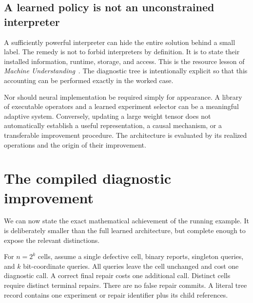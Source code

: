 \documentclass[11pt,letterpaper]{article}
\theoremstyle{plain}
\theoremstyle{definition}
\begin{document}
\subsection{A learned policy is not an unconstrained interpreter}
A sufficiently powerful interpreter can hide the entire solution behind a small label. The remedy is not to forbid interpreters by definition. It is to state their installed information, runtime, storage, and access. This is the resource lesson of \emph{Machine Understanding}~\cite{understanding}. The diagnostic tree is intentionally explicit so that this accounting can be performed exactly in the worked case.

Nor should neural implementation be required simply for appearance. A library of executable operators and a learned experiment selector can be a meaningful adaptive system. Conversely, updating a large weight tensor does not automatically establish a useful representation, a causal mechanism, or a transferable improvement procedure. The architecture is evaluated by its realized operations and the origin of their improvement.

\section{The compiled diagnostic improvement}\label{sec:worked}
We can now state the exact mathematical achievement of the running example. It is deliberately smaller than the full learned architecture, but complete enough to expose the relevant distinctions.

For $n=2^k$ cells, assume a single defective cell, binary reports, singleton queries, and $k$ bit-coordinate queries. All queries leave the cell unchanged and cost one diagnostic call. A correct final repair costs one additional call. Distinct cells require distinct terminal repairs. There are no false repair commits. A literal tree record contains one experiment or repair identifier plus its child references.
\end{document}
